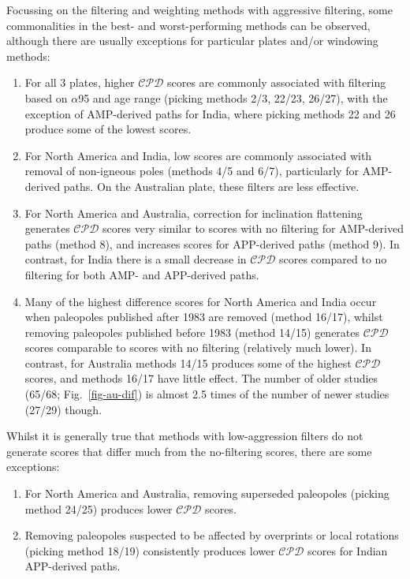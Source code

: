 Focussing on the filtering and weighting methods with aggressive filtering,
some commonalities in the best- and worst-performing methods can be observed,
although there are usually exceptions for particular plates and/or windowing
methods:
%
\begin{enumerate}
  \item For all 3 plates, higher $\mathcal{CPD}$ scores are commonly associated
		with filtering based on $\alpha$95 and age range (picking methods
		2/3, 22/23, 26/27), with the exception of AMP-derived paths for India,
		where picking methods 22 and 26 produce some of the lowest scores.
  \item For North America and India, low scores are commonly associated with
		removal of non-igneous poles (methods 4/5 and 6/7), particularly for
		AMP-derived paths. On the Australian plate, these filters are less
		effective.
  \item For North America and Australia, correction for inclination flattening
		generates $\mathcal{CPD}$ scores very similar to scores with no
		filtering for AMP-derived paths (method 8), and increases scores for
		APP-derived paths (method 9). In contrast, for India there is a small
		decrease in $\mathcal{CPD}$ scores compared to no filtering for both
		AMP- and APP-derived paths.
  \item Many of the highest difference scores for North America and India occur
		when paleopoles published after 1983 are removed (method 16/17), whilst
		removing paleopoles published before 1983 (method 14/15) generates
		$\mathcal{CPD}$ scores comparable to scores with no filtering
		(relatively much lower). In contrast, for Australia methods 14/15
		produces some of the highest $\mathcal{CPD}$ scores, and methods 16/17
		have little effect. The number of older studies (65/68;
		Fig.~\ref{fig-au-dif}) is almost 2.5 times of the number of newer
		studies (27/29) though.
\end{enumerate}

Whilst it is generally true that methods with low-aggression filters do not
generate scores that differ much from the no-filtering scores, there are some
exceptions:
%
\begin{enumerate}
  \item For North America and Australia, removing superseded paleopoles (picking
		method 24/25) produces lower $\mathcal{CPD}$ scores.
  \item Removing paleopoles suspected to be affected by overprints or local
		rotations (picking method 18/19) consistently produces lower
		$\mathcal{CPD}$ scores for Indian APP-derived paths.
\end{enumerate}

